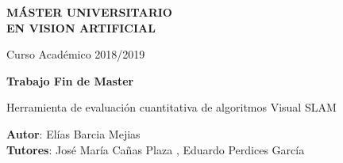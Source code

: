 \thispagestyle{empty}
\vspace{5cm}


\begin{center}
  {\large {\bf MÁSTER UNIVERSITARIO\\ EN VISION ARTIFICIAL}}
  \vspace{5mm}
 
  {\large {Curso Académico 2018/2019}}

  \vspace{2cm}

  {\large {\bf  Trabajo Fin de Master}}

  \vspace{3cm}

  {\Large {{\Huge { Herramienta de evaluación cuantitativa de algoritmos Visual SLAM }} \\[1cm] }}




  \vspace{5cm}
  {\bf Autor}: Elías Barcia Mejias\\
  {\bf Tutores}: José María Cañas Plaza , Eduardo Perdices García
\end{center}
